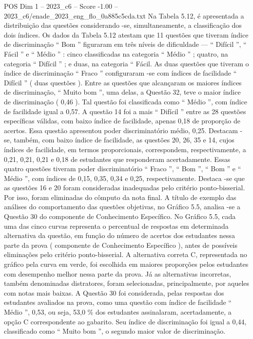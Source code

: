 \begin{textsample}{POS Dim 1 – 2023\_c6 – Score -1.00 – 2023\_c6/enade\_2023\_eng\_flo\_0a885c5cda.txt}
Na Tabela 5.12, é apresentada a distribuição das questões considerando -se, simultaneamente, a classificação dos dois índices.
Os dados da Tabela 5.12 atestam que 11 questões que tiveram índice de discriminação “ Bom ” figuraram em três níveis de dificuldade — “ Difícil ”, “ Fácil ” e “ Médio ” : cinco classificadas na categoria “ Médio ” ; quatro, na categoria “ Difícil ” ; e duas, na categoria “ Fácil.
As duas questões que tiveram o índice de discriminação “ Fraco ” configuraram -se com índices de facilidade “ Difícil ” ( duas questões ).
Entre as questões que alcançaram os maiores índices de discriminação, “ Muito bom ”, uma delas, a Questão 32, teve o maior índice de discriminação ( 0,46 ).
Tal questão foi classificada como “ Médio ”, com índice de facilidade igual a 0,57.
A questão 14 foi a mais “ Difícil ” entre as 28 questões específicas válidas, com baixo índice de facilidade, apenas 0,18 de proporção de acertos.
Essa questão apresentou poder discriminatório médio, 0,25.
Destacam -se, também, com baixo índice de facilidade, as questões 20, 26, 35 e 14, cujos índices de facilidade, em termos proporcionais, correspondem, respectivamente, a 0,21, 0,21, 0,21 e 0,18 de estudantes que responderam acertadamente.
Essas quatro questões tiveram poder discriminatório “ Fraco ”, “ Bom ”, “ Bom ” e “ Médio ”, com índices de 0,15, 0,35, 0,34 e 0,25, respectivamente.
Destaca -se que as questões 16 e 20 foram consideradas inadequadas pelo critério ponto-bisserial.
Por isso, foram eliminadas do cômputo da nota final.
A título de exemplo das análises do comportamento das questões objetivas, no Gráfico 5.5, analisa -se a Questão 30 do componente de Conhecimento Específico.
No Gráfico 5.5, cada uma das cinco curvas representa o percentual de respostas em determinada alternativa da questão, em função do número de acertos dos estudantes nessa parte da prova ( componente de Conhecimento Específico ), antes de possíveis eliminações pelo critério ponto-bisserial.
A alternativa correta C, representada no gráfico pela curva em verde, foi escolhida em maiores proporções pelos estudantes com desempenho melhor nessa parte da prova.
Já as alternativas incorretas, também denominadas distratores, foram selecionadas, principalmente, por aqueles com notas mais baixas.
A Questão 30 foi considerada, pelas respostas dos estudantes avaliados na prova, como uma questão com índice de facilidade “ Médio ”, 0,53, ou seja, 53,0 \% dos estudantes assinalaram, acertadamente, a opção C correspondente ao gabarito.
Seu índice de discriminação foi igual a 0,44, classificado como “ Muito bom ”, o segundo maior valor de discriminação.

\end{textsample}
